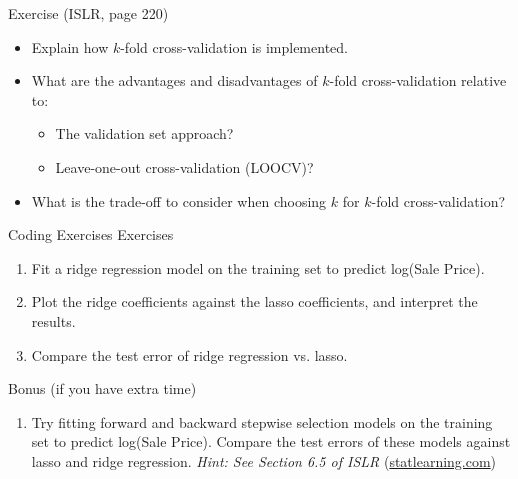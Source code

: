 \documentclass{beamer}
\begin{document}
  \begin{frame}{Exercise (ISLR, page 220)}
    \begin{itemize}
      \item[(a)] Explain how $k$-fold cross-validation is implemented.
      \item[(b)] What are the advantages and disadvantages of $k$-fold cross-validation relative to:
      \begin{itemize}
        \item[i.] The validation set approach?
        \item[ii.] Leave-one-out cross-validation (LOOCV)?
      \end{itemize}
      \item[(c)] What is the trade-off to consider when choosing $k$ for $k$-fold cross-validation?
    \end{itemize}
  \end{frame}

  \begin{frame}{Coding Exercises}
    Exercises
    \begin{enumerate}
      \item Fit a ridge regression model on the training set to predict log(Sale Price).
      \item Plot the ridge coefficients against the lasso coefficients, and interpret the results.
      \item Compare the test error of ridge regression vs. lasso.
    \end{enumerate}
    \vfill
    Bonus (if you have extra time)
    \begin{enumerate}
      \item[4.] Try fitting forward and backward stepwise selection models on the training set to predict log(Sale Price). Compare the test errors of these models against lasso and ridge regression.
      \textit{Hint: See Section 6.5 of ISLR} (\url{statlearning.com})
    \end{enumerate}
  \end{frame}
\end{document}
